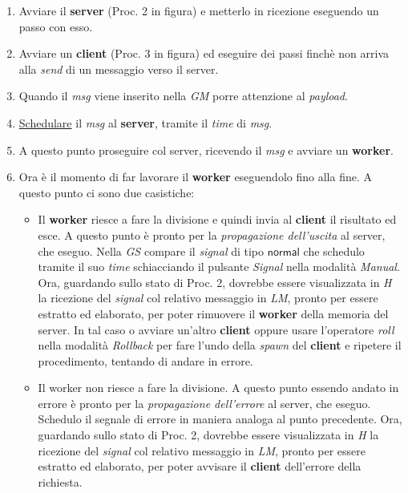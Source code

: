 \documentclass[Contributo.tex]{subfiles}
\begin{document}
\begin{enumerate}
	\item Avviare il \textbf{server} (Proc. 2 in figura) e metterlo in ricezione eseguendo un passo con esso.
	\item Avviare un \textbf{client} (Proc. 3 in figura) ed eseguire dei passi finchè non arriva alla \textit{send} di un messaggio verso il server.
	\item Quando il \textit{msg} viene inserito nella \textit{GM} porre attenzione al \textit{payload}.
	\item \underline{Schedulare} il \textit{msg} al \textbf{server}, tramite il \textit{time} di \textit{msg}.
	\item A questo punto proseguire col server, ricevendo il \textit{msg} e avviare un \textbf{worker}.
	\item Ora è il momento di far lavorare il \textbf{worker} eseguendolo fino alla fine. A questo punto ci sono due casistiche:
		\begin{itemize}
			\item Il \textbf{worker} riesce a fare la divisione e quindi invia al \textbf{client} il risultato ed esce. A questo punto è pronto per la \textit{propagazione dell'uscita} al server, che eseguo. Nella \textit{GS} compare il \textit{signal} di tipo $\mathsf{normal}$ che schedulo tramite il suo \textit{time} schiacciando il pulsante \textit{Signal} nella modalità \textit{Manual}. Ora, guardando sullo stato di Proc. 2, dovrebbe essere visualizzata in \textit{H} la ricezione del \textit{signal} col relativo messaggio in \textit{LM}, pronto per essere estratto ed elaborato, per poter rimuovere il \textbf{worker} della memoria del server.
			In tal caso o avviare un'altro \textbf{client} oppure usare l'operatore \textit{roll} nella modalità \textit{Rollback} per fare l'undo della \textit{spawn} del \textbf{client} e ripetere il procedimento, tentando di andare in errore.
			\item Il worker non riesce a fare la divisione. A questo punto essendo andato in errore è pronto per la \textit{propagazione dell'errore} al server, che eseguo. Schedulo il segnale di errore in maniera analoga al punto precedente. Ora, guardando sullo stato di Proc. 2, dovrebbe essere visualizzata in \textit{H} la ricezione del \textit{signal} col relativo messaggio in \textit{LM}, pronto per essere estratto ed elaborato, per poter avvisare il \textbf{client} dell'errore della richiesta.
		\end{itemize}
\end{enumerate}
\end{document}
